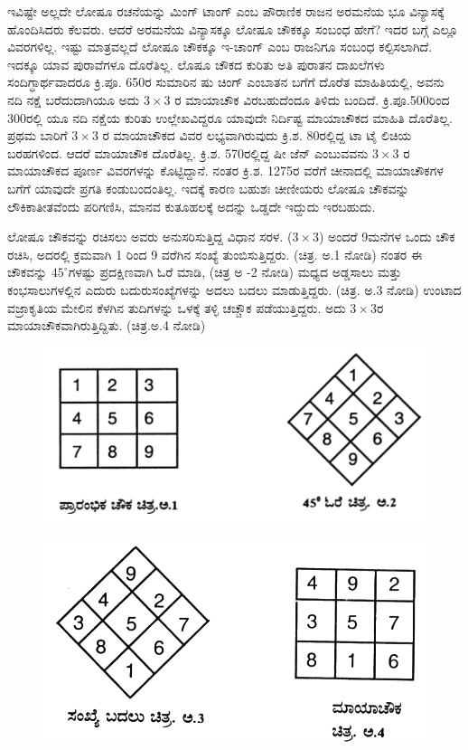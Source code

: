 \smallskip
ಇವಿಷ್ಟೇ ಅಲ್ಲದೇ ಲೋಷೂ ರಚನೆಯನ್ನು ಮಿಂಗ್ ಟಾಂಗ್ ಎಂಬ ಪೌರಾಣಿಕ ರಾಜನ ಅರಮನೆಯ ಭೂ ವಿನ್ಯಾಸಕ್ಕೆ ಹೊಂದಿಸಿದರು ಕೆಲವರು. ಆದರೆ ಅರಮನೆಯ ವಿನ್ಯಾಸಕ್ಕೂ ಲೋಷೂ ಚೌಕಕ್ಕೂ ಸಂಬಂಧ ಹೇಗೆ? ಇದರ ಬಗ್ಗೆ ಎಲ್ಲೂ ವಿವರಗಳಿಲ್ಲ. ಇಷ್ಟು ಮಾತ್ರವಲ್ಲದೆ ಲೋಷೂ ಚೌಕಕ್ಕೂ ಇ-ಚಾಂಗ್ ಎಂಬ ರಾಜನಿಗೂ ಸಂಬಂಧ ಕಲ್ಪಿಸಲಾಗಿದೆ. \hbox{ಇದಕ್ಕೂ} ಯಾವ ಪುರಾವೆಗಳೂ ದೊರೆತಿಲ್ಲ. ಲೊಷೂ ಚೌಕದ ಕುರಿತು ಅತಿ ಪುರಾತನ ದಾಖಲೆಗಳು ಸಂದಿಗ್ಧಾರ್ಥವಾದರೂ ಕ್ರಿ.ಪೂ. 650ರ ಸುಮಾರಿನ ಷು ಚಿಂಗ್ ಎಂಬಾತನ ಬಗೆಗೆ ದೊರೆತ ಮಾಹಿತಿಯಲ್ಲಿ, ಅವನು ನದಿ ನಕ್ಷೆ ಬರೆದುದಾಗಿಯೂ ಅದು $3 \times 3$ ರ ಮಾಯಾಚೌಕ \hbox{ವಿರಬಹುದೆಂದೂ} ತಿಳಿದು ಬಂದಿದೆ. ಕ್ರಿ.ಪೂ.500ರಿಂದ 300ರಲ್ಲಿ ಯೂ ನದಿ ನಕ್ಷೆಯ \hbox{ಕುರಿತು} ಉಲ್ಲೇಖವಿದ್ದರೂ ಯಾವುದೇ ನಿರ್ದಿಷ್ಟ ಮಾಯಾಚೌಕದ ಮಾಹಿತಿ ದೊರೆತಿಲ್ಲ. ಪ್ರಥಮ ಬಾರಿಗೆ $3 \times 3$ ರ ಮಾಯಾ\-ಚೌಕದ ವಿವರ ಲಭ್ಯವಾಗಿರುವುದು ಕ್ರಿ.ಶ. 80ರಲ್ಲಿದ್ದ ಟಾ ಟೈ ಲಿಚಿಯ ಬರಹ\-ಗಳಿಂದ. ಆದರೆ ಮಾಯಾಚೌಕ ದೊರೆತಿಲ್ಲ. ಕ್ರಿ.ಶ. 570ರಲ್ಲಿದ್ದ ಷೀ ಜೆನ್ ಎಂಬುವವನು $3 \times 3$ ರ ಮಾಯಾಚೌಕದ ಪೂರ್ಣ ವಿವರಗಳನ್ನು ಕೊಟ್ಟಿದ್ದಾನೆ. ನಂತರ ಕ್ರಿ.ಶ. 1275ರ ವರೆಗೆ ಚೀನಾದಲ್ಲಿ ಮಾಯಾಚೌಕಗಳ ಬಗೆಗೆ ಯಾವುದೇ ಪ್ರಗತಿ ಕಂಡುಬಂದಂತಿಲ್ಲ. \linebreak ಇದಕ್ಕೆ ಕಾರಣ ಬಹುಶಃ ಚೀಣೀಯರು ಲೋಷೂ ಚೌಕವನ್ನು ಲೌಕಿಕಾತೀತವೆಂದು ಪರಿಗಣಿಸಿ, \break ಮಾನವ ಕುತೂಹಲಕ್ಕೆ ಅದನ್ನು ಒಡ್ಡದೇ ಇದ್ದುದು ಇರಬಹುದು.

\smallskip
ಲೋಷೂ ಚೌಕವನ್ನು ರಚಿಸಲು ಅವರು ಅನುಸರಿಸುತ್ತಿದ್ದ ವಿಧಾನ ಸರಳ. ($3 \times 3$) ಅಂದರೆ 9ಮನೆಗಳ ಒಂದು ಚೌಕ ರಚಿಸಿ, ಅದರಲ್ಲಿ ಕ್ರಮವಾಗಿ 1 ರಿಂದ 9 ವರೆಗಿನ ಸಂಖ್ಯೆ ತುಂಬಿಸುತ್ತಿದ್ದರು. (ಚಿತ್ರ. ಅ.1 ನೋಡಿ) ನಂತರ ಈ ಚೌಕವನ್ನು $45^\circ$ಗಳಷ್ಟು ಪ್ರದಕ್ಷಿಣವಾಗಿ ಓರೆ ಮಾಡಿ, (ಚಿತ್ರ ಅ -2 ನೋಡಿ) ಮಧ್ಯದ ಅಡ್ಡಸಾಲು ಮತ್ತು ಕಂಭಸಾಲುಗಳಲ್ಲಿನ ಎದುರು ಬದುರುಸಂಖ್ಯೆಗಳನ್ನು ಅದಲು ಬದಲು ಮಾಡುತ್ತಿದ್ದರು. (ಚಿತ್ರ. ಅ.3 ನೋಡಿ) ಉಂಟಾದ ವಜ್ರಾಕೃತಿಯ ಮೇಲಿನ ಕೆಳಗಿನ ತುದಿಗಳನ್ನು ಒಳಕ್ಕೆ ತಳ್ಳಿ ಚಚ್ಚೌಕ ಪಡೆಯುತ್ತಿದ್ದರು. ಅದು $3 \times 3$ರ ಮಾಯಾಚೌಕವಾಗಿರುತ್ತಿದ್ದಿತು. (ಚಿತ್ರ.ಅ.4 ನೋಡಿ)
\begin{figure}[H]
\includegraphics{src/figures/chap9/fig9-2.jpg}
\end{figure}
\begin{figure}[H]
\includegraphics{src/figures/chap9/fig9-3.jpg}
\end{figure}

